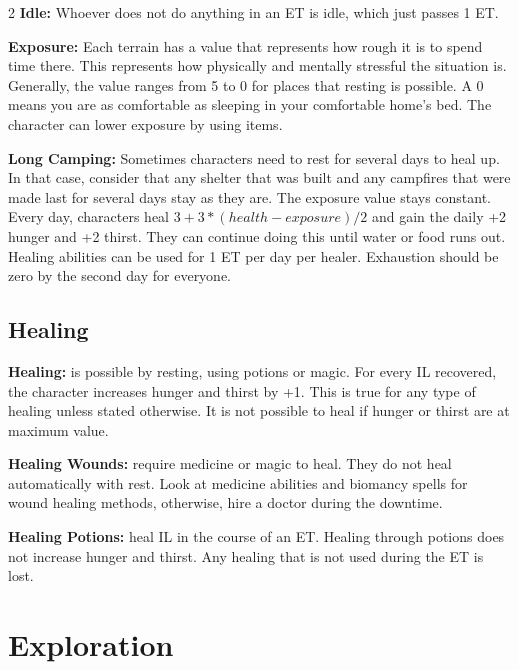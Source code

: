 \begin{multicols}{2}
\textbf{Idle:} Whoever does not do anything in an ET is idle, which just passes 1 ET.

\textbf{Exposure:} Each terrain has a value that represents how rough it is to spend time there. This represents how physically and mentally stressful the situation is. Generally, the value ranges from 5 to 0 for places that resting is possible. A 0 means you are as comfortable as sleeping in your comfortable home's bed. The character can lower exposure by using items.

\textbf{Long Camping:} Sometimes characters need to rest for several days to heal up. In that case, consider that any shelter that was built and any campfires that were made last for several days stay as they are. The exposure value stays constant. Every day, characters heal $3+3*(health-exposure)/2$ and gain the daily +2 hunger and +2 thirst. They can continue doing this until water or food runs out. Healing abilities can be used for 1 ET per day per healer. Exhaustion should be zero by the second day for everyone.

\subsection{Healing}

\textbf{Healing:} is possible by resting, using potions or magic. For every IL recovered, the character increases hunger and thirst by +1. This is true for any type of healing unless stated otherwise. It is not possible to heal if hunger or thirst are at maximum value.

\textbf{Healing Wounds:} require medicine or magic to heal. They do not heal automatically with rest. Look at medicine abilities and biomancy spells for wound healing methods, otherwise, hire a doctor during the downtime.

\textbf{Healing Potions:} heal IL in the course of an ET. Healing through potions does not increase hunger and thirst. Any healing that is not used during the ET is lost.



\section{Exploration}


\end{multicols}
